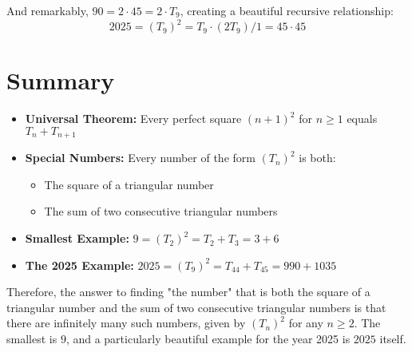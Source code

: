 \documentclass[12pt]{article}
\begin{document}
And remarkably, $90 = 2 \cdot 45 = 2 \cdot T_9$, creating a beautiful recursive relationship:
\begin{equation}
2025 = (T_9)^2 = T_9 \cdot (2T_9) / 1 = 45 \cdot 45
\end{equation}

\section*{Summary}

\begin{itemize}
\item \textbf{Universal Theorem:} Every perfect square $(n+1)^2$ for $n \geq 1$ equals $T_n + T_{n+1}$
\item \textbf{Special Numbers:} Every number of the form $(T_n)^2$ is both:
\begin{itemize}
\item The square of a triangular number
\item The sum of two consecutive triangular numbers
\end{itemize}
\item \textbf{Smallest Example:} $9 = (T_2)^2 = T_2 + T_3 = 3 + 6$
\item \textbf{The 2025 Example:} $2025 = (T_9)^2 = T_{44} + T_{45} = 990 + 1035$
\end{itemize}

\vspace{1cm}

Therefore, the answer to finding "the number" that is both the square of a triangular number and the sum of two consecutive triangular numbers is that there are infinitely many such numbers, given by $(T_n)^2$ for any $n \geq 2$. The smallest is $\boxed{9}$, and a particularly beautiful example for the year 2025 is $\boxed{2025}$ itself.
\end{document}
